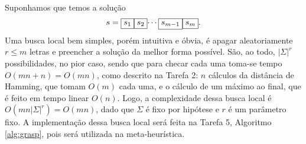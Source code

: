 Suponhamos que temos a solução
\[s = \text{\fbox{$s_1$}\fbox{$s_2$}$\cdots$\fbox{$s_{m-1}$}\fbox{$s_m$}}.\]
Uma busca local bem simples, porém intuitiva e óbvia, é apagar aleatoriamente $r \le m$ letras e preencher a solução da melhor forma possível. São, ao todo, $|\Sigma|^r$ possibilidades, no pior caso, sendo que para checar cada uma toma-se tempo $O(mn+n) = O(mn)$, como descrito na Tarefa 2: $n$ cálculos da distância de Hamming, que tomam $O(m)$ cada uma, e o cálculo de um máximo ao final, que é feito em tempo linear $O(n)$. Logo, a complexidade dessa busca local é $O(mn|\Sigma|^r) = O(mn)$, dado que $\Sigma$ é fixo por hipótese e $r$ é um parâmetro fixo.
A implementação dessa busca local será feita na Tarefa 5, Algoritmo \ref{alg:grasp}, pois será utilizada na meta-heurística.
